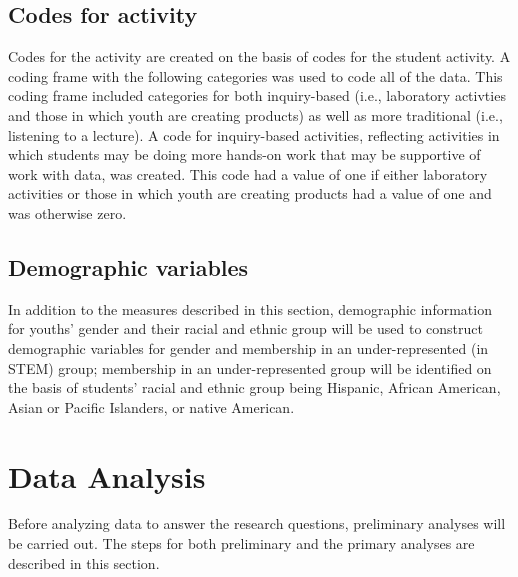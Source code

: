 \documentclass[]{msu-thesis}
\theoremstyle{definition}
\theoremstyle{definition}
\theoremstyle{definition}
\theoremstyle{remark}
\begin{document}
\subsection{Codes for activity}\label{codes-for-activity}

Codes for the activity are created on the basis of codes for the student
activity. A coding frame with the following categories was used to code
all of the data. This coding frame included categories for both
inquiry-based (i.e., laboratory activties and those in which youth are
creating products) as well as more traditional (i.e., listening to a
lecture). A code for inquiry-based activities, reflecting activities in
which students may be doing more hands-on work that may be supportive of
work with data, was created. This code had a value of one if either
laboratory activities or those in which youth are creating products had
a value of one and was otherwise zero.

\subsection{Demographic variables}\label{demographic-variables}

In addition to the measures described in this section, demographic
information for youths' gender and their racial and ethnic group will be
used to construct demographic variables for gender and membership in an
under-represented (in STEM) group; membership in an under-represented
group will be identified on the basis of students' racial and ethnic
group being Hispanic, African American, Asian or Pacific Islanders, or
native American.

\section{Data Analysis}\label{data-analysis}

Before analyzing data to answer the research questions, preliminary
analyses will be carried out. The steps for both preliminary and the
primary analyses are described in this section.
\end{document}

